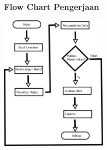 \documentclass[table,dvipsnames]{beamer}
\begin{document}
\begin{frame}
\frametitle{Flow Chart Pengerjaan}
\begin{center}
 \includegraphics[width=150pt]{./pengerjaan/work}
\end{center}
\end{frame}

%
\end{document}

